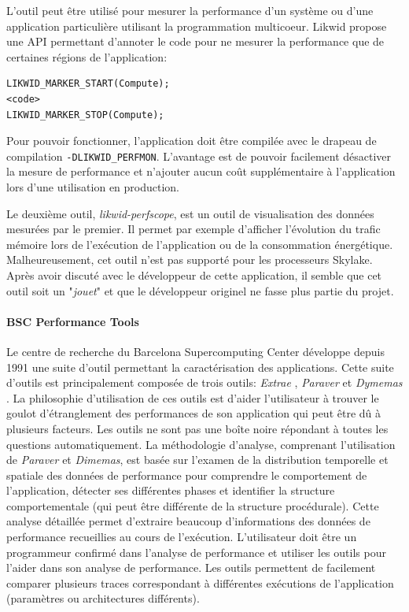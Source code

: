             L'outil peut être utilisé pour mesurer la performance d'un système ou d'une application particulière utilisant la programmation multicoeur. 
        Likwid propose une API permettant d'annoter le code pour ne mesurer la performance que de certaines régions de l'application:
\begin{lstlisting}
LIKWID_MARKER_START(Compute);
<code>
LIKWID_MARKER_STOP(Compute);
\end{lstlisting}
            Pour pouvoir fonctionner, l'application doit être compilée avec le drapeau de compilation \verb|-DLIKWID_PERFMON|. L'avantage est de pouvoir facilement désactiver la mesure de performance et n'ajouter aucun coût supplémentaire à l'application lors d'une utilisation en production.
        
        
            Le deuxième outil, \textit{likwid-perfscope}, est un outil de visualisation des données mesurées par le premier. Il permet par exemple d'afficher l'évolution du trafic mémoire lors de l'exécution de l'application ou de la consommation énergétique. Malheureusement, cet outil n'est pas supporté pour les processeurs Skylake. Après avoir discuté avec le développeur de cette application, il semble que cet outil soit un "\textit{jouet}" et que le développeur originel ne fasse plus partie du projet.  
           
        \paragraph{BSC Performance Tools}
            Le centre de recherche du Barcelona Supercomputing Center développe depuis 1991 une suite d'outil permettant la caractérisation des applications. Cette suite d'outils est principalement composée de trois outils: \textit{Extrae} \cite{Rodriguez}, \textit{Paraver} \cite{Pillet1995} et \textit{Dymemas} \cite{Labarta1997}. La philosophie d'utilisation de ces outils est d'aider l'utilisateur à trouver le goulot d'étranglement des performances de son application qui peut être dû à plusieurs facteurs. Les outils ne sont pas une boîte noire répondant à toutes les questions automatiquement. La méthodologie d'analyse, comprenant l'utilisation de \textit{Paraver} et \textit{Dimemas}, est basée sur l'examen de la distribution temporelle et spatiale des données de performance pour comprendre le comportement de l'application, détecter ses différentes phases et identifier la structure comportementale (qui peut être différente de la structure procédurale). Cette analyse détaillée permet d'extraire beaucoup d'informations des données de performance recueillies au cours de l'exécution. L'utilisateur doit être un programmeur confirmé dans l'analyse de performance et utiliser les outils pour l'aider dans son analyse de performance. Les outils permettent de facilement comparer plusieurs traces correspondant à différentes exécutions de l'application (paramètres ou architectures différents). 
            
